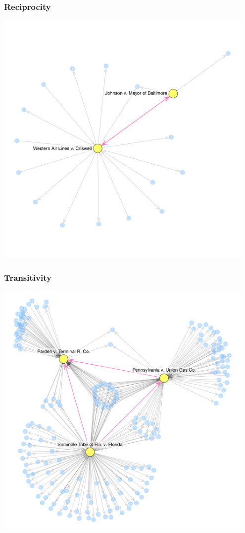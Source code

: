 \documentclass[handout]{beamer}
\begin{document}
\begin{frame} \frametitle{Reciprocity}

\centering

\includegraphics[width = 0.95\textwidth,trim= 0cm 1cm 0cm 2cm,clip=true ]{../../../NetworkVisualizations/citations_recip.pdf}

\end{frame}

\begin{frame} \frametitle{Transitivity}
\centering

\includegraphics[width = 0.95\textwidth,trim= 0cm 1cm 0cm 2cm,clip=true ]{../../../NetworkVisualizations/citations_trans.pdf}

\end{frame}
\end{document}
